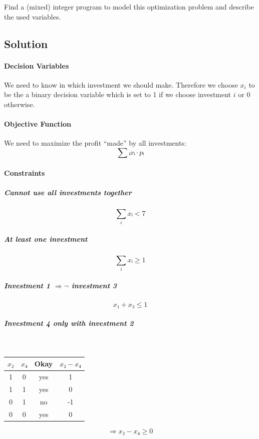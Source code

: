 \documentclass[a4paper, 12pt]{report}
\begin{document}
Find a (mixed) integer program to model this optimization problem and describe
the used variables.

\subsection{Solution}

\paragraph{Decision Variables}

We need to know in which investment we should make. Therefore we choose $x_i$
to be the a binary decision variable which is set to 1 if we choose investment
$i$ or 0 otherwise.

\paragraph{Objective Function}

We need to maximize the profit “made” by all investments:
\[
    ∑ᵢ xᵢ · pᵢ
\]

\paragraph{Constraints}

\subparagraph{Cannot use all investments together}
\[
    ∑_{i} xᵢ < 7
\]

\subparagraph{At least one investment}
\[
    ∑_{i} xᵢ ≥ 1
\]

\subparagraph{Investment 1 $⇒ ¬$ investment 3}
\[
    x₁ + x₃ ≤ 1
\]

\subparagraph{Investment 4 only with investment 2}~\\[5pt]
\begin{minipage}[t]{0.35\textwidth}
\begin{tabular}{cccc}
    $x₂$ & $x₄$ & Okay & $x₂-x₄$\\
    \hline
     1   &  0   & yes  & 1\\
     1   &  1   & yes  & 0\\
     0   &  1   & no   & -1\\
     0   &  0   & yes  & 0\\
\end{tabular}
\end{minipage}
\begin{minipage}[t]{0.35\textwidth}
\[
    ⇒ x₂ - x₄ ≥ 0
\]
\end{minipage}
\end{document}
